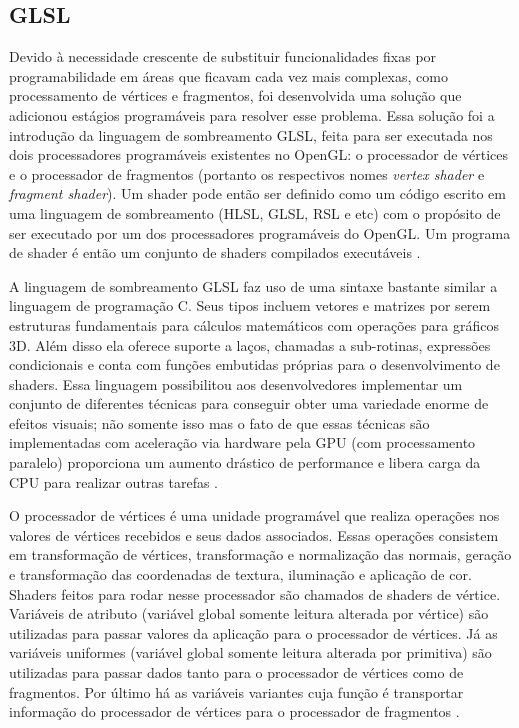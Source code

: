 \subsection{GLSL}
\label{sec:glsl}

Devido à necessidade crescente de substituir funcionalidades fixas por programabilidade em áreas que ficavam cada vez mais complexas, como processamento de vértices e fragmentos, foi desenvolvida uma solução que adicionou estágios programáveis para resolver esse problema. Essa solução foi a introdução da linguagem de sombreamento \acrshort{GLSL}, feita para ser executada nos dois processadores programáveis existentes no OpenGL: o processador de vértices e o processador de fragmentos (portanto os respectivos nomes \textit{vertex shader} e \textit{fragment shader}). Um shader pode então ser definido como um código escrito em uma linguagem de sombreamento (HLSL, GLSL, RSL e etc) com o propósito de ser executado por um dos processadores programáveis do OpenGL. Um programa de shader é então um conjunto de shaders compilados executáveis \cite{GLSLBook}.

A linguagem de sombreamento GLSL faz uso de uma sintaxe bastante similar a linguagem de programação C. Seus tipos incluem vetores e matrizes por serem estruturas fundamentais para cálculos matemáticos com operações para gráficos 3D. Além disso ela oferece suporte a laços, chamadas a sub-rotinas, expressões condicionais e conta com funções embutidas próprias para o desenvolvimento de shaders. Essa linguagem possibilitou aos desenvolvedores implementar um conjunto de diferentes técnicas para conseguir obter uma variedade enorme de efeitos visuais; não somente isso mas o fato de que essas técnicas são implementadas com aceleração via hardware pela GPU (com processamento paralelo) proporciona um aumento drástico de performance e libera carga da CPU para realizar outras tarefas \cite{GLSLBook}.

O processador de vértices é uma unidade programável que realiza operações nos valores de vértices recebidos e seus dados associados. Essas operações consistem em transformação de vértices, transformação e normalização das normais, geração e transformação das coordenadas de textura, iluminação e aplicação de cor. Shaders feitos para rodar nesse processador são chamados de shaders de vértice. Variáveis de atributo (variável global somente leitura alterada por vértice) são utilizadas para passar valores da aplicação para o processador de vértices. Já as variáveis uniformes (variável global somente leitura alterada por primitiva) são utilizadas para passar dados tanto para o processador de vértices como de fragmentos. Por último há as variáveis variantes cuja função é transportar informação do processador de vértices para o processador de fragmentos \cite{GLSLBook}.

